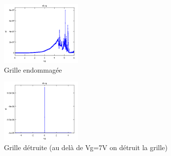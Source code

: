  \begin{figure}[h]
    \begin{center}
        \includegraphics[width=150px]{Images/Grille_Endommagee}
        \caption{Grille endommagée}
        \label{fig:}
    \end{center}
\end{figure}

 \begin{figure}[h]
    \begin{center}
        \includegraphics[width=150px]{Images/Grille_Detruite}
        \caption{Grille détruite (au delà de Vg=7V on détruit la grille)}
        \label{fig:}
    \end{center}
\end{figure}



